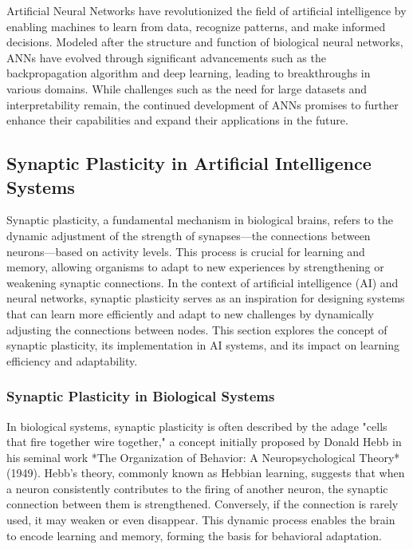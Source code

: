 \documentclass[12pt,twoside]{article}
\begin{document}
Artificial Neural Networks have revolutionized the field of artificial intelligence by enabling machines to learn from data, recognize patterns, and make informed decisions. Modeled after the structure and function of biological neural networks, ANNs have evolved through significant advancements such as the backpropagation algorithm and deep learning, leading to breakthroughs in various domains. While challenges such as the need for large datasets and interpretability remain, the continued development of ANNs promises to further enhance their capabilities and expand their applications in the future.

\subsection{Synaptic Plasticity in Artificial Intelligence Systems}

Synaptic plasticity, a fundamental mechanism in biological brains, refers to the dynamic adjustment of the strength of synapses—the connections between neurons—based on activity levels. This process is crucial for learning and memory, allowing organisms to adapt to new experiences by strengthening or weakening synaptic connections. In the context of artificial intelligence (AI) and neural networks, synaptic plasticity serves as an inspiration for designing systems that can learn more efficiently and adapt to new challenges by dynamically adjusting the connections between nodes. This section explores the concept of synaptic plasticity, its implementation in AI systems, and its impact on learning efficiency and adaptability.

\subsubsection{Synaptic Plasticity in Biological Systems}

In biological systems, synaptic plasticity is often described by the adage "cells that fire together wire together," a concept initially proposed by Donald Hebb in his seminal work *The Organization of Behavior: A Neuropsychological Theory* (1949). Hebb's theory, commonly known as Hebbian learning, suggests that when a neuron consistently contributes to the firing of another neuron, the synaptic connection between them is strengthened. Conversely, if the connection is rarely used, it may weaken or even disappear. This dynamic process enables the brain to encode learning and memory, forming the basis for behavioral adaptation.
\end{document}
